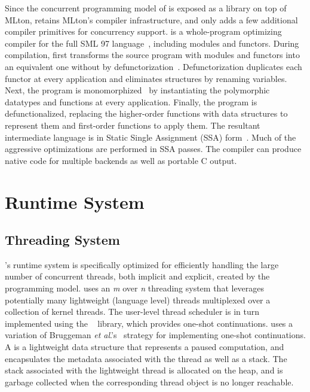 Since the concurrent programming model of \MM is exposed as a library on top of
MLton, \MM retains MLton's compiler infrastructure, and only adds a few
additional compiler primitives for concurrency support. \MM is a whole-program
optimizing compiler for the full SML 97 language~\cite{SML97}, including
modules and functors. During compilation, \MM first transforms the source
program with modules and functors into an equivalent one without by
defunctorization~\cite{}. Defunctorization duplicates each functor at every
application and eliminates structures by renaming variables. Next, the program
is monomorphized~\cite{} by instantiating the polymorphic datatypes and
functions at every application. Finally, the program is defunctionalized,
replacing the higher-order functions with data structures to represent them and
first-order functions to apply them. The resultant intermediate language is in
Static Single Assignment (SSA) form~\cite{SSA}. Much of the aggressive
optimizations are performed in SSA passes. The compiler can produce native code
for multiple backends as well as portable C output.

\section{Runtime System}

\subsection{Threading System}

\MM's runtime system is specifically optimized for efficiently handling the
large number of concurrent threads, both implicit and explicit, created by the
\acml programming model. \MM uses an {\em m} over {\em n} threading system that
leverages potentially many lightweight (language level) threads multiplexed
over a collection of kernel threads. The user-level thread scheduler is in turn
implemented using the ~\cite{MLton} library, which provides
one-shot continuations.  uses a variation of Bruggeman
\emph{et al}.'s~\cite{Bruggeman1996} strategy for implementing one-shot
continuations. A  is a lightweight data structure that
represents a paused computation, and encapsulates the metadata associated with
the thread as well as a stack. The stack associated with the lightweight thread
is allocated on the heap, and is garbage collected when the corresponding
thread object is no longer reachable.


